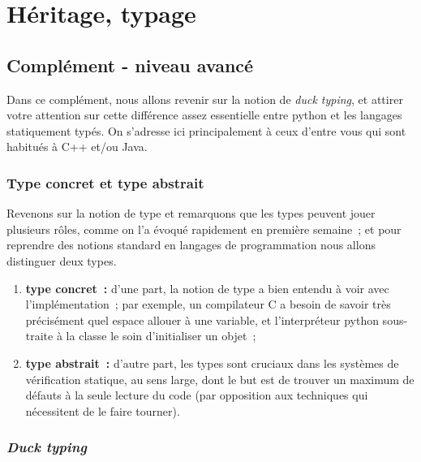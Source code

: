     
    
    
    

    

    \hypertarget{huxe9ritage-typage}{%
\section{Héritage, typage}\label{huxe9ritage-typage}}

    \hypertarget{compluxe9ment---niveau-avancuxe9}{%
\subsection{Complément - niveau
avancé}\label{compluxe9ment---niveau-avancuxe9}}

    Dans ce complément, nous allons revenir sur la notion de \emph{duck
typing}, et attirer votre attention sur cette différence assez
essentielle entre python et les langages statiquement typés. On
s'adresse ici principalement à ceux d'entre vous qui sont habitués à C++
et/ou Java.

    \hypertarget{type-concret-et-type-abstrait}{%
\subsubsection{Type concret et type
abstrait}\label{type-concret-et-type-abstrait}}

    Revenons sur la notion de type et remarquons que les types peuvent jouer
plusieurs rôles, comme on l'a évoqué rapidement en première semaine~; et
pour reprendre des notions standard en langages de programmation nous
allons distinguer deux types.

\begin{enumerate}
\def\labelenumi{\arabic{enumi}.}
\tightlist
\item
  \textbf{type concret~:} d'une part, la notion de type a bien entendu à
  voir avec l'implémentation~; par exemple, un compilateur C a besoin de
  savoir très précisément quel espace allouer à une variable, et
  l'interpréteur python sous-traite à la classe le soin d'initialiser un
  objet~;
\item
  \textbf{type abstrait~:} d'autre part, les types sont cruciaux dans
  les systèmes de vérification statique, au sens large, dont le but est
  de trouver un maximum de défauts à la seule lecture du code (par
  opposition aux techniques qui nécessitent de le faire tourner).
\end{enumerate}

    \hypertarget{duck-typing}{%
\subsubsection{\texorpdfstring{\emph{Duck
typing}}{Duck typing}}\label{duck-typing}}


